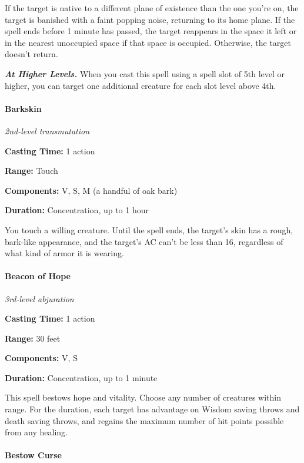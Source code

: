 \documentclass[
]{article}
\begin{document}
If the target is native to a different plane of existence than the one
you're on, the target is banished with a faint popping noise, returning
to its home plane. If the spell ends before 1 minute has passed, the
target reappears in the space it left or in the nearest unoccupied space
if that space is occupied. Otherwise, the target doesn't return.

\emph{\textbf{At Higher Levels.}} When you cast this spell using a spell
slot of 5th level or higher, you can target one additional creature for
each slot level above 4th.

\hypertarget{barkskin}{%
\paragraph{Barkskin}\label{barkskin}}

\emph{2nd-level transmutation}

\textbf{Casting Time:} 1 action

\textbf{Range:} Touch

\textbf{Components:} V, S, M (a handful of oak bark)

\textbf{Duration:} Concentration, up to 1 hour

You touch a willing creature. Until the spell ends, the target's skin
has a rough, bark-like appearance, and the target's AC can't be less
than 16, regardless of what kind of armor it is wearing.

\hypertarget{beacon-of-hope}{%
\paragraph{Beacon of Hope}\label{beacon-of-hope}}

\emph{3rd-level abjuration}

\textbf{Casting Time:} 1 action

\textbf{Range:} 30 feet

\textbf{Components:} V, S

\textbf{Duration:} Concentration, up to 1 minute

This spell bestows hope and vitality. Choose any number of creatures
within range. For the duration, each target has advantage on Wisdom
saving throws and death saving throws, and regains the maximum number of
hit points possible from any healing.

\hypertarget{bestow-curse}{%
\paragraph{Bestow Curse}\label{bestow-curse}}
\end{document}
